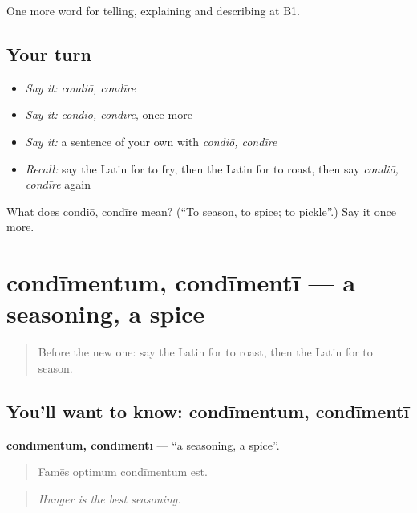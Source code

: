 \begin{grammarlens}[title={What you've built}]
One more word for telling, explaining and describing at B1.
\end{grammarlens}

\subsection*{Your turn}
\begin{itemize}
\raggedright
  \item \emph{Say it:} \emph{condiō, condīre}
  \item \emph{Say it:} \emph{condiō, condīre}, once more
  \item \emph{Say it:} a sentence of your own with \emph{condiō, condīre}
  \item \emph{Recall:} say the Latin for to fry, then the Latin for to roast, then say \emph{condiō, condīre} again
\end{itemize}

\begin{tcolorbox}[breakable,colback=teal!4,colframe=teal!35!black,title={Before you move on}]
What does condiō, condīre mean? (\textquotedblleft{}To season, to spice; to pickle\textquotedblright{}.) Say it once more.
\end{tcolorbox}
\section[condīmentum, condīmentī]{condīmentum, condīmentī — a seasoning, a spice}

\label{lesson:LA-C355-condimentum}



\begin{quote}
Before the new one: say the Latin for to roast, then the Latin for to season.
\end{quote}

\subsection*{You'll want to know: condīmentum, condīmentī}
\textbf{condīmentum, condīmentī} — \textquotedblleft{}a seasoning, a spice\textquotedblright{}.

\begin{quote}
Famēs optimum condīmentum est.
\end{quote}

\begin{quote}
\emph{Hunger is the best seasoning.}
\end{quote}

